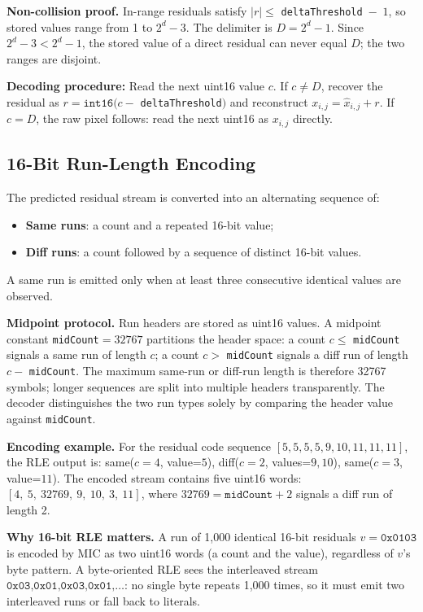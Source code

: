 \documentclass[journal]{IEEEtran}
\begin{document}
\textbf{Non-collision proof.} In-range residuals satisfy $|r| \leq$
\texttt{deltaThreshold}~$-$~$1$, so stored values range from 1 to $2^d - 3$.
The delimiter is $D = 2^d - 1$. Since $2^d - 3 < 2^d - 1$, the stored value of
a direct residual can never equal $D$; the two ranges are disjoint.

\textbf{Decoding procedure:} Read the next uint16 value $c$.
If $c \neq D$, recover the residual as $r = \texttt{int16}(c -$
\texttt{deltaThreshold}$)$ and reconstruct $x_{i,j} = \hat{x}_{i,j} + r$.
If $c = D$, the raw pixel follows: read the next uint16 as $x_{i,j}$ directly.

\subsection{16-Bit Run-Length Encoding}

The predicted residual stream is converted into an alternating sequence of:
\begin{itemize}
  \item \textbf{Same runs}: a count and a repeated 16-bit value;
  \item \textbf{Diff runs}: a count followed by a sequence of distinct 16-bit
  values.
\end{itemize}

A same run is emitted only when at least three consecutive identical values are
observed.

\textbf{Midpoint protocol.} Run headers are stored as uint16 values. A
midpoint constant \texttt{midCount}$= 32767$ partitions the header space: a
count $c \leq$ \texttt{midCount} signals a same run of length $c$; a count
$c >$ \texttt{midCount} signals a diff run of length $c -$ \texttt{midCount}.
The maximum same-run or diff-run length is therefore 32767 symbols; longer
sequences are split into multiple headers transparently. The decoder
distinguishes the two run types solely by comparing the header value against
\texttt{midCount}.

\textbf{Encoding example.} For the residual code sequence
$[5,5,5,5,9,10,11,11,11]$, the RLE output is:
same($c=4$, value=$5$), diff($c=2$, values=$9,10$), same($c=3$, value=$11$).
The encoded stream contains five uint16 words: $[4,\ 5,\ 32769,\ 9,\ 10,\ 3,\ 11]$,
where $32769 = \texttt{midCount} + 2$ signals a diff run of length 2.

\textbf{Why 16-bit RLE matters.} A run of 1,000 identical 16-bit residuals
$v = \texttt{0x0103}$ is encoded by MIC as two uint16 words (a count and the
value), regardless of $v$'s byte pattern. A byte-oriented RLE sees the
interleaved stream $\texttt{0x03,0x01,0x03,0x01,\ldots}$: no single byte
repeats 1,000 times, so it must emit two interleaved runs or fall back to
literals.
\end{document}
